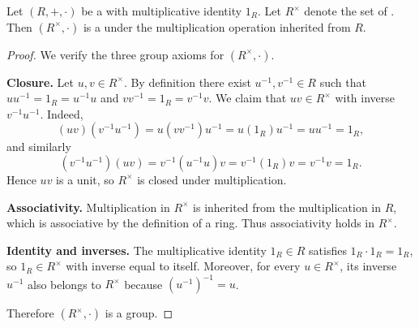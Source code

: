 \begin{lemma} \label{lemma:unit_group_of_a_ring_is_a_group}
    Let $(R,+,\cdot)$ be a  with multiplicative identity $1_R$. Let $R^\times$ denote the set of . Then $(R^\times, \cdot)$ is a  under the multiplication operation inherited from $R$.
\end{lemma}

\begin{proof}
    We verify the three group axioms for $(R^\times, \cdot)$.

    \textbf{Closure.} Let $u, v \in R^\times$. By definition there exist $u^{-1}, v^{-1} \in R$ such that $uu^{-1} = 1_R = u^{-1}u$ and $vv^{-1} = 1_R = v^{-1}v$. We claim that $uv \in R^\times$ with inverse $v^{-1}u^{-1}$. Indeed,
    $$ (uv)(v^{-1}u^{-1}) = u(vv^{-1})u^{-1} = u(1_R)u^{-1} = uu^{-1} = 1_R, $$
    and similarly
    $$ (v^{-1}u^{-1})(uv) = v^{-1}(u^{-1}u)v = v^{-1}(1_R)v = v^{-1}v = 1_R. $$
    Hence $uv$ is a unit, so $R^\times$ is closed under multiplication.

    \textbf{Associativity.} Multiplication in $R^\times$ is inherited from the multiplication in $R$, which is associative by the definition of a ring. Thus associativity holds in $R^\times$.

    \textbf{Identity and inverses.} The multiplicative identity $1_R \in R$ satisfies $1_R \cdot 1_R = 1_R$, so $1_R \in R^\times$ with inverse equal to itself. Moreover, for every $u \in R^\times$, its inverse $u^{-1}$ also belongs to $R^\times$ because $(u^{-1})^{-1} = u$.

    Therefore $(R^\times, \cdot)$ is a group.
\end{proof}
